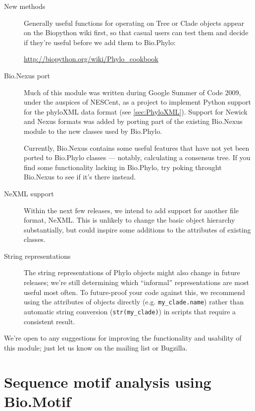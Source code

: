 \documentclass{report}
\begin{document}
\begin{description}
  \item[New methods] 
    Generally useful functions for operating on Tree or Clade objects appear on the Biopython
    wiki first, so that casual users can test them and decide if they're useful before we add
    them to Bio.Phylo:

    \url{http://biopython.org/wiki/Phylo_cookbook}

  \item[Bio.Nexus port]
    Much of this module was written during Google Summer of Code 2009, under the auspices of
    NESCent, as a project to implement Python support for the phyloXML data format (see
    \ref{sec:PhyloXML}). Support for Newick and Nexus formats was added by porting part of the
    existing Bio.Nexus module to the new classes used by Bio.Phylo.

    Currently, Bio.Nexus contains some useful features that have not yet been ported to
    Bio.Phylo classes --- notably, calculating a consensus tree. If you find some functionality
    lacking in Bio.Phylo, try poking throught Bio.Nexus to see if it's there instead.

  \item[NeXML support]  
    Within the next few releases, we intend to add support for another file format, NeXML. This
    is unlikely to change the basic object hierarchy substantially, but could inspire some
    additions to the attributes of existing classes.

  \item[String representations] 
    The string representations of Phylo objects might also change in future releases; we're
    still determining which ``informal'' representations are most useful most often. To
    future-proof your code against this, we recommend using the attributes of objects directly
    (e.g.  \verb|my_clade.name|) rather than automatic string conversion (\verb|str(my_clade)|)
    in scripts that require a consistent result.

\end{description}

We're open to any suggestions for improving the functionality and usability of this module;
just let us know on the mailing list or Bugzilla.

\chapter{Sequence motif analysis using Bio.Motif}
\label{chap:bio_motif}
\end{document}

